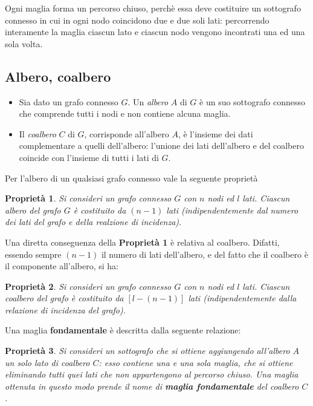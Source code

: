 \documentclass[a4paper]{report}
\newtheorem{prop}{Propriet\`a}
\begin{document}
Ogni maglia forma un percorso chiuso, perch\`e essa deve costituire un
sottografo connesso in cui in ogni nodo coincidono due e due soli
lati: percorrendo interamente la maglia ciascun lato e ciascun nodo
vengono incontrati una ed una sola volta.

\subsection{Albero, coalbero}

\begin{itemize}
\item Sia dato un grafo connesso $G$. Un \emph{albero} $A$ di $G$ \`e
  un suo sottografo connesso che comprende tutti i nodi e non
  contiene alcuna maglia.
\item Il \emph{coalbero} $C$ di $G$, corrisponde all'albero $A$, \`e
  l'insieme dei dati complementare a quelli dell'albero: l'unione dei
  lati dell'albero e del coalbero coincide con l'insieme di tutti i
  lati di $G$.
\end{itemize}

Per l'albero di un qualsiasi grafo connesso vale la seguente
propriet\`a

\begin{prop}
  Si consideri un grafo connesso $G$ con $n$ nodi ed $l$ lati. Ciascun
  albero del grafo $G$ \`e costituito da $(n-1)$ lati
  (indipendentemente dal numero dei lati del grafo e della realzione
  di incidenza).
\end{prop}

Una diretta conseguenza della {\bf Propriet\`a 1} \`e relativa al
coalbero. Difatti, essendo sempre $(n-1)$ il numero di lati
dell'albero, e del fatto che il coalbero \`e il componente all'albero,
si ha:

\begin{prop}
  Si consideri un grafo connesso $G$ con $n$ nodi ed $l$ lati. Ciascun
  coalbero del grafo \`e costituito da $[l-(n-1)]$ lati
  (indipendentemente dalla relazione di incidenza del grafo).
\end{prop}

Una maglia {\bf fondamentale} \`e descritta dalla seguente relazione:

\begin{prop}
  Si consideri un sottografo che si ottiene aggiungendo all'albero $A$
  un solo lato di coalbero $C$: esso contiene una e una sola maglia,
  che si ottiene eliminando tutti quei lati che non appartengono al
  percorso chiuso. Una maglia ottenuta in questo modo prende il nome
  di {\bf maglia fondamentale} del coalbero $C$.
\end{prop}
\end{document}
